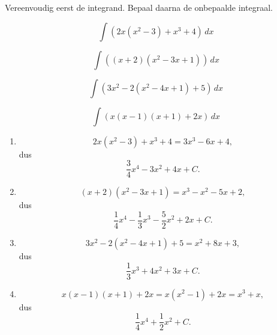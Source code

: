 \documentclass{ximera}
\begin{document}
\begin{oefening}{\oefB\ESS}

Vereenvoudig eerst de integrand. Bepaal daarna de onbepaalde integraal.

\begin{question}
\[
\int \left(2x(x^2-3)+x^3+4\right)\,dx
\]
\end{question}

\begin{question}
\[
\int \left((x+2)(x^2-3x+1)\right)\,dx
\]
\end{question}

\begin{question}
\[
\int \left(3x^2-2(x^2-4x+1)+5\right)\,dx
\]
\end{question}

\begin{question}
\[
\int \left(x(x-1)(x+1)+2x\right)\,dx
\]
\end{question}

\begin{oplossing}

\begin{enumerate}
\item
\[
2x(x^2-3)+x^3+4=3x^3-6x+4,
\]
dus
\[
\boxed{\frac34x^4-3x^2+4x+C}.
\]

\item
\[
(x+2)(x^2-3x+1)=x^3-x^2-5x+2,
\]
dus
\[
\boxed{\frac14x^4-\frac13x^3-\frac52x^2+2x+C}.
\]

\item
\[
3x^2-2(x^2-4x+1)+5=x^2+8x+3,
\]
dus
\[
\boxed{\frac13x^3+4x^2+3x+C}.
\]

\item
\[
x(x-1)(x+1)+2x=x(x^2-1)+2x=x^3+x,
\]
dus
\[
\boxed{\frac14x^4+\frac12x^2+C}.
\]
\end{enumerate}

\end{oplossing}

\end{oefening}


\end{document}
